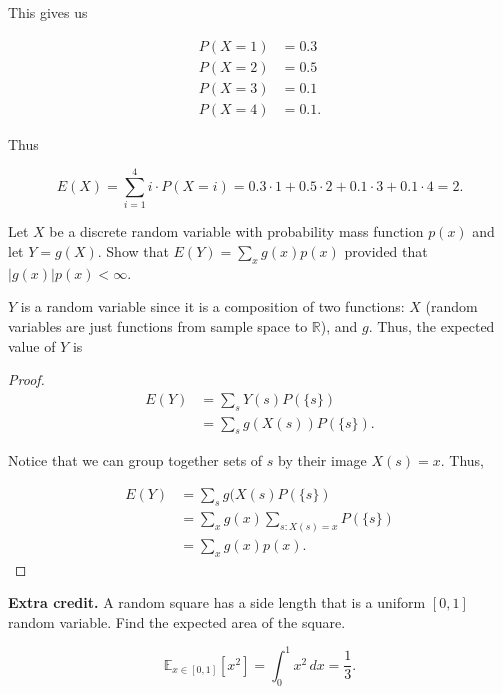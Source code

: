 \documentclass[answers]{exam}
\begin{document}
\begin{questions}
\begin{solution}
This gives us

\begin{align*}
    P(X=1) &= 0.3 \\ 
    P(X=2) &= 0.5 \\ 
    P(X=3) &= 0.1 \\
    P(X=4) &= 0.1
.\end{align*}

Thus

\[
E(X) = \sum_{i=1}^{4}i \cdot P(X=i) = 0.3 \cdot 1 + 0.5 \cdot 2 + 0.1 \cdot 3 +
0.1 \cdot 4 = 2
.\] 
\end{solution}

\question[10]
Let \(X\) be a discrete random variable with probability mass function \(p(x)\)
and let \(Y=g(X)\). Show that \(E(Y)=\sum_{x}g(x)p(x)\) provided that
\(|g(x)|p(x)<\infty\).

\begin{solution}
$Y$ is a random variable since it is a composition of two functions: $X$ (random
variables are just functions from sample space to $\mathbb{R}$), and $g$. Thus,
the expected value of $Y$ is

\begin{proof}
\begin{align*}
    E(Y) &= \sum_{s}^{}Y(s)P(\{s\}) \\ 
    &= \sum_{s}^{} g(X(s)) P(\{s\})
.\end{align*}

Notice that we can group together sets of $s$ by their image $X(s)=x$. Thus,

\begin{align*}
    E(Y) &= \sum_{s}g(X(s)P(\{s\}) \\ 
    &= \sum_{x}^{} g(x) \sum_{s:X(s) = x}^{} P(\{s\}) \\ 
    &= \sum_{x}^{} g(x)p(x)
.\end{align*}
\end{proof}
\end{solution}

\question[10]
\textbf{Extra credit.} A random square has a side length that is a uniform \([0,
1]\) random variable. Find the expected area of the square.

\begin{solution}
\[
    \mathbb{E}_{x \in [0,1]}[x^2] = \int_{0}^{1} x^2 \, dx = \frac{1}{3}
.\] 
\end{solution}
\end{questions}
\end{document}
